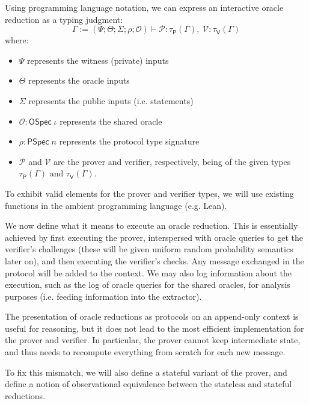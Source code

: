 Using programming language notation, we can express an interactive oracle reduction as a typing judgment:
\[
    \Gamma := (\Psi; \Theta; \varSigma; \rho; \mathcal{O}) \vdash \mathcal{P} : \tau_{\mathsf{P}}(\Gamma), \; \mathcal{V} : \tau_{\mathsf{V}}(\Gamma)
\]
where:
\begin{itemize}
    \item $\Psi$ represents the witness (private) inputs
    \item $\Theta$ represents the oracle inputs
    \item $\varSigma$ represents the public inputs (i.e. statements)
    \item $\mathcal{O} : \mathsf{OSpec}\; \iota$ represents the shared oracle
    \item $\rho : \mathsf{PSpec}\; n$ represents the protocol type signature
    \item $\mathcal{P}$ and $\mathcal{V}$ are the prover and verifier, respectively, being of the given types $\tau_{\mathsf{P}}(\Gamma)$ and $\tau_{\mathsf{V}}(\Gamma)$.
\end{itemize}

To exhibit valid elements for the prover and verifier types, we will use existing functions in the ambient programming language (e.g. Lean).

We now define what it means to execute an oracle reduction. This is essentially achieved by first
executing the prover, interspersed with oracle queries to get the verifier's challenges (these will
be given uniform random probability semantics later on), and then executing the verifier's checks.
Any message exchanged in the protocol will be added to the context. We may also log information
about the execution, such as the log of oracle queries for the shared oracles, for analysis purposes
(i.e. feeding information into the extractor).

\begin{definition}
    \label{def:oracle_reduction_execution}
\end{definition}

\begin{remark}
    The presentation of oracle reductions as protocols on an append-only context is useful for
    reasoning, but it does not lead to the most efficient implementation for the prover and
    verifier. In particular, the prover cannot keep intermediate state, and thus needs to recompute
    everything from scratch for each new message.

    To fix this mismatch, we will also define a stateful variant of the prover, and define a notion
    of observational equivalence between the stateless and stateful reductions.
\end{remark}

